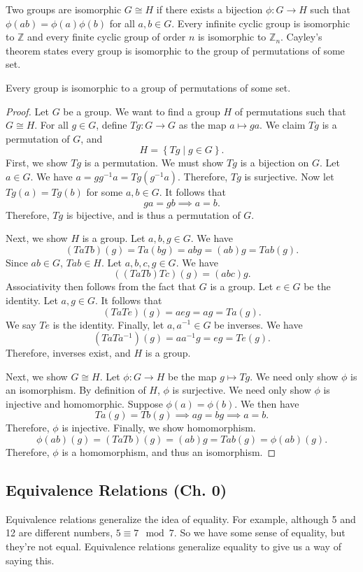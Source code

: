\begin{prev}
Two groups are isomorphic $G\cong H$ if there exists a bijection $\phi : G \to H$ such that $\phi (ab)=\phi (a)\phi (b)$ for all $a,b\in G$. Every infinite cyclic group is isomorphic to $\mathbb{Z}$ and every finite cyclic group of order $n$ is isomorphic to $\mathbb{Z}_n$. Cayley's theorem states every group is isomorphic to the group of permutations of some set.
\end{prev}
\begin{theorem}[Cayley]\label{thm:cayley}
	Every group is isomorphic to a group of permutations of some set.
\end{theorem}
\begin{proof}
	Let $G$ be a group. We want to find a  group $H$ of permutations such that $G\cong H$. For all $g\in G$, define $Tg : G \to G$ as the map $a\mapsto ga$. We claim $Tg$ is a permutation of $G$, and
	\[
		H=\left\{ Tg \mid g\in G \right\} 
	.\]
	First, we show  $Tg$ is a permutation. We must show $Tg$ is a bijection on $G$. Let $a\in G$. We have $a=gg^{-1}a=Tg\left( g^{-1}a \right) $. Therefore, $Tg$ is surjective. Now let $Tg(a)=Tg(b)$ for some $a,b\in G$. It follows that
	\[
		ga=gb\implies a=b
	.\]
	Therefore, $Tg$ is bijective, and is thus a permutation of $G$.

	Next, we show $ H$ is a group. Let $a,b,g\in G$. We have
	\[
		(TaTb)(g)=Ta(bg)=abg=(ab)g=Tab(g)
	.\]
	Since $ab\in G$, $Tab\in H$. Let $a,b,c,g\in G$. We have
	\[
		\left( (TaTb)Tc \right) (g)=(abc)g
	.\]
	Associativity then follows from the fact that $G$ is a group. Let $e\in G$ be the identity. Let $a,g\in G$. It follows that
	\[
		(TaTe)(g)=aeg=ag=Ta(g)
	.\]
	We say $Te$ is the identity. Finally, let $a,a^{-1}\in G$ be inverses. We have
	\[
		\left( TaTa^{-1} \right) (g)=aa^{-1}g=eg=Te(g)
	.\]
	Therefore, inverses exist, and $H$ is a group.

	Next, we show $G\cong H$. Let $\phi : G \to H$ be the map $g\mapsto Tg$. We need only show $\phi $ is an isomorphism. By definition of $H$, $\phi $ is surjective. We need only show $\phi $ is injective and homomorphic. Suppose $\phi (a)=\phi (b)$. We then have
	\[
		Ta(g)=Tb(g)\implies ag=bg\implies a=b
	.\]
	Therefore, $\phi $ is injective. Finally, we show homomorphism.
	\[
		\phi (ab)(g)=(TaTb)(g)=(ab)g=Tab(g)=\phi (ab)(g)
	.\]
	Therefore, $\phi $ is a homomorphism, and thus an isomorphism.
\end{proof}

\subsection{Equivalence Relations (Ch. 0)}
Equivalence relations generalize the idea of equality. For example, although 5 and 12 are different numbers, $5\equiv 7\mod{7}$. So we have some sense of equality, but they're not equal. Equivalence relations generalize equality to give us a way of saying this.

